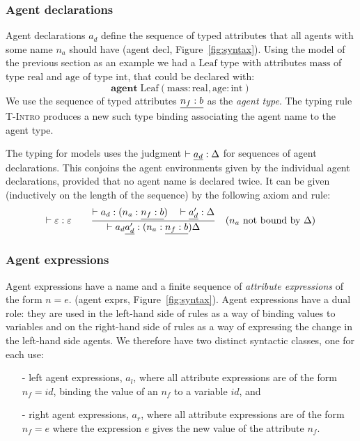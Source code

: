 \subsubsection*{Agent declarations}
Agent declarations $a_d$ define the sequence of typed attributes that all agents
with some name $n_a$ should have (\textsf{agent decl},
Figure~\ref{fig:syntax}). Using the model of the previous section as an example
we had a $\mathrm{Leaf}$ type with attributes $\mathrm{mass}$ of type
$\mathrm{real}$ and $\mathrm{age}$ of type $\mathrm{int}$, that could be
declared with:
$$\mathbf{agent} \; \mathrm{Leaf}(\mathrm{mass}:\mathrm{real}, \mathrm{age}:\mathrm{int})
$$
We use the sequence of typed attributes $\underline{n_f:b}$ as the \emph{agent
type}. The typing rule \textsc{T-Intro} produces a new such type binding
associating the agent name to the agent type.

The typing  for models uses the judgment $\vdash \underline{a_d}: \Delta$ for sequences of agent declarations.  This conjoins the agent environments given by the individual agent declarations, provided that no agent name is declared twice. It can be given (inductively on the length of the sequence) by the following axiom and rule:
%
\[\vdash \varepsilon:\varepsilon   \qquad \frac{\vdash a_d: (n_a: \underline{n_f:b})  \quad \vdash \underline{a'_d}: \Delta}{\vdash a_d \underline{a'_d}: (n_a: \underline{n_f:b})  \Delta} \quad (n_a \mbox{ not bound by } \Delta)\]

\subsubsection*{Agent expressions}
Agent expressions have a name and a finite sequence of \emph{attribute expressions} of the form $n = e$. (\textsf{agent expr}s, Figure~\ref{fig:syntax}). Agent expressions have a dual role: they are used in the left-hand side of rules as a way of binding values to variables and on the right-hand side of rules as a way of expressing the change in the left-hand side agents. We therefore have two distinct syntactic classes, one for each use:
\begin{itemize}
\item[-] left  agent expressions, $a_l$, where all attribute expressions are of the form $n_f = id$, 
 binding the value of an $n_f$ to a variable $id$, and
\item[-] right agent expressions, $a_r$, where all attribute expressions are of the form $n_f = e$ where  the expression $e$ gives the new value of the attribute $n_f$.
\end{itemize}



